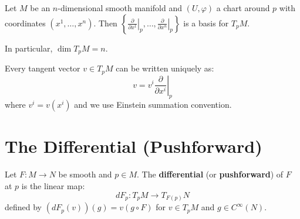 \begin{theorem}
    Let $M$ be an $n$-dimensional smooth manifold and $(U, \varphi)$ a chart around $p$ with coordinates $(x^1, \ldots, x^n)$. Then $\left\{\left.\frac{\partial}{\partial x^1}\right|_p, \ldots, \left.\frac{\partial}{\partial x^n}\right|_p\right\}$ is a basis for $T_pM$.

    In particular, $\dim T_pM = n$.
\end{theorem}

\begin{corollary}
    Every tangent vector $v \in T_pM$ can be written uniquely as:
    \[
        v = v^i \left.\frac{\partial}{\partial x^i}\right|_p
    \]
    where $v^i = v(x^i)$ and we use Einstein summation convention.
\end{corollary}

\section{The Differential (Pushforward)}

\begin{definition}
    Let $F: M \to N$ be smooth and $p \in M$. The \textbf{differential} (or \textbf{pushforward}) of $F$ at $p$ is the linear map:
    \[
        dF_p: T_pM \to T_{F(p)}N
    \]
    defined by $(dF_p(v))(g) = v(g \circ F)$ for $v \in T_pM$ and $g \in C^\infty(N)$.
\end{definition}

